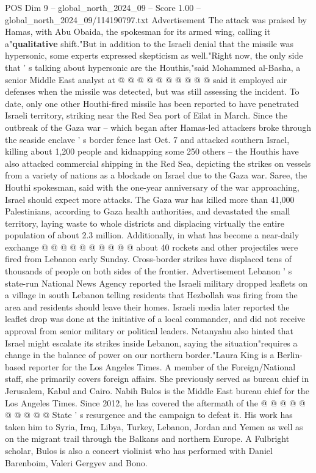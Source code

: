 \begin{textsample}{POS Dim 9 – global\_north\_2024\_09 – Score 1.00 – global\_north\_2024\_09/114190797.txt}
Advertisement The attack was praised by Hamas, with Abu Obaida, the spokesman for its armed wing, calling it a"\textbf{qualitative} shift."But in addition to the Israeli denial that the missile was hypersonic, some experts expressed skepticism as well."Right now, the only side that ' s talking about hypersonic are the Houthis,"said Mohammed al-Basha, a senior Middle East analyst at @ @ @ @ @ @ @ @ @ @ said it employed air defenses when the missile was detected, but was still assessing the incident.
To date, only one other Houthi-fired missile has been reported to have penetrated Israeli territory, striking near the Red Sea port of Eilat in March.
Since the outbreak of the Gaza war -- which began after Hamas-led attackers broke through the seaside enclave ' s border fence last Oct. 7 and attacked southern Israel, killing about 1,200 people and kidnapping some 250 others -- the Houthis have also attacked commercial shipping in the Red Sea, depicting the strikes on vessels from a variety of nations as a blockade on Israel due to the Gaza war.
Saree, the Houthi spokesman, said with the one-year anniversary of the war approaching, Israel should expect more attacks.
The Gaza war has killed more than 41,000 Palestinians, according to Gaza health authorities, and devastated the small territory, laying waste to whole districts and displacing virtually the entire population of about 2.3 million.
Additionally, in what has become a near-daily exchange @ @ @ @ @ @ @ @ @ @ about 40 rockets and other projectiles were fired from Lebanon early Sunday.
Cross-border strikes have displaced tens of thousands of people on both sides of the frontier.
Advertisement Lebanon ' s state-run National News Agency reported the Israeli military dropped leaflets on a village in south Lebanon telling residents that Hezbollah was firing from the area and residents should leave their homes.
Israeli media later reported the leaflet drop was done at the initiative of a local commander, and did not receive approval from senior military or political leaders.
Netanyahu also hinted that Israel might escalate its strikes inside Lebanon, saying the situation"requires a change in the balance of power on our northern border."Laura King is a Berlin-based reporter for the Los Angeles Times.
A member of the Foreign/National staff, she primarily covers foreign affairs.
She previously served as bureau chief in Jerusalem, Kabul and Cairo.
Nabih Bulos is the Middle East bureau chief for the Los Angeles Times.
Since 2012, he has covered the aftermath of the @ @ @ @ @ @ @ @ @ @ State ' s resurgence and the campaign to defeat it.
His work has taken him to Syria, Iraq, Libya, Turkey, Lebanon, Jordan and Yemen as well as on the migrant trail through the Balkans and northern Europe.
A Fulbright scholar, Bulos is also a concert violinist who has performed with Daniel Barenboim, Valeri Gergyev and Bono.

\end{textsample}
